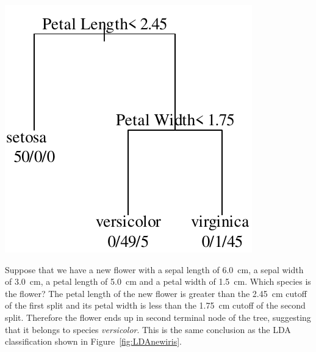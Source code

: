 \noindent\begin{minipage}[t][][b]{.3\textwidth}
\includegraphics[width=\textwidth]{../figures/irisCART.pdf}\\
\end{minipage}
\begin{minipage}[t][][t]{.7\textwidth}
  \label{fig:irisCART}
\end{minipage}

Suppose that we have a new flower with a sepal length of 6.0~cm, a
sepal width of 3.0~cm, a petal length of 5.0~cm and a petal width of
1.5~cm. Which species is the flower? The petal length of the new
flower is greater than the 2.45~cm cutoff of the first split and its
petal width is less than the 1.75~cm cutoff of the second
split. Therefore the flower ends up in second terminal node of the
tree, suggesting that it belongs to species \emph{versicolor}.
This is the same conclusion as the LDA classification shown in
Figure~\ref{fig:LDAnewiris}.


